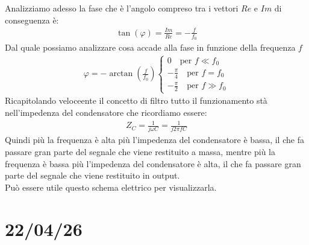 \documentclass[a4paper, oneside]{article}
\begin{document}
Analizziamo adesso la fase che è l'angolo compreso tra i vettori $Re$ e $Im$ di conseguenza è:
\begin{gather*}
    \tan(\varphi) = \frac{Im}{Re} = - \frac{f}{f_0}
\end{gather*}
Dal quale possiamo analizzare cosa accade alla fase in funzione della frequenza $f$
\begin{gather*}
    \varphi = - \arctan(\frac{f}{f_0})
    \begin{cases}
        0 \quad \text{per } f \ll f_0\\
        -\frac{\pi}{4} \quad \text{per } f = f_0\\
        -\frac{\pi}{2} \quad \text{per } f \gg f_0
    \end{cases}
\end{gather*}
Ricapitolando veloceente il concetto di filtro tutto il funzionamento stà nell'impedenza del condensatore che ricordiamo essere:
\begin{gather*}
    Z_C = \frac{1}{j \omega C} = \frac{1}{j 2 \pi f C}
\end{gather*}
Quindi più la frequenza è alta più l'impedenza del condensatore è bassa, il che fa passare gran parte del segnale che viene restituito a massa, mentre più la frequenza è bassa più l'impedenza del condensatore è alta, il che fa passare gran parte del segnale che viene restituito in output.\\
Può essere utile questo schema elettrico per visualizzarla.


\newpage
\section{22/04/26}
\end{document}
